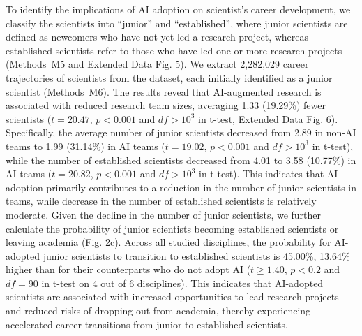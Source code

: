 To identify the implications of AI adoption on scientist’s career development, we classify the scientists into “junior” and “established”, where junior scientists are defined as newcomers who have not yet led a research project, whereas established scientists refer to those who have led one or more research projects (Methods~M5 and Extended Data Fig. 5).
We extract 2,282,029 career trajectories of scientists from the dataset, each initially identified as a junior scientist (Methods~M6).
The results reveal that AI-augmented research is associated with reduced research team sizes, averaging 1.33 (19.29\%) fewer scientists ($t=20.47$, $p<0.001$ and $df>10^3$ in t-test, Extended Data Fig. 6).
Specifically, the average number of junior scientists decreased from 2.89 in non-AI teams to 1.99 (31.14\%) in AI teams ($t=19.02$, $p<0.001$ and $df>10^3$ in t-test), while the number of established scientists decreased from 4.01 to 3.58 (10.77\%) in AI teams ($t=20.82$, $p<0.001$ and $df>10^3$ in t-test).
This indicates that AI adoption primarily contributes to a reduction in the number of junior scientists in teams, while decrease in the number of established scientists is relatively moderate.
Given the decline in the number of junior scientists, we further calculate the probability of junior scientists becoming established scientists or leaving academia (Fig. 2c).
Across all studied disciplines, the probability for AI-adopted junior scientists to transition to established scientists is 45.00\%, 13.64\% higher than for their counterparts who do not adopt AI ($t\geq1.40$, $p<0.2$ and $df=90$ in t-test on 4 out of 6 disciplines).
This indicates that AI-adopted scientists are associated with increased opportunities to lead research projects and reduced risks of dropping out from academia, thereby experiencing accelerated career transitions from junior to established scientists.

